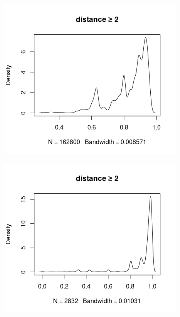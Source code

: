 \documentclass{l4proj}
\theoremstyle{definition}
\theoremstyle{remark}
\begin{document}
\begin{appendices}
  \begin{figure}
    \centering
    \begin{subfigure}[t]{0.49\textwidth}
      \centering
      \includegraphics[width=\textwidth]{images/mcs_prop2.png}
    \end{subfigure}
    \begin{subfigure}[t]{0.49\textwidth}
      \centering
      \includegraphics[width=\textwidth]{images/sip_prop2.png}
    \end{subfigure}

\end{figure}
\end{appendices}
\end{document}
